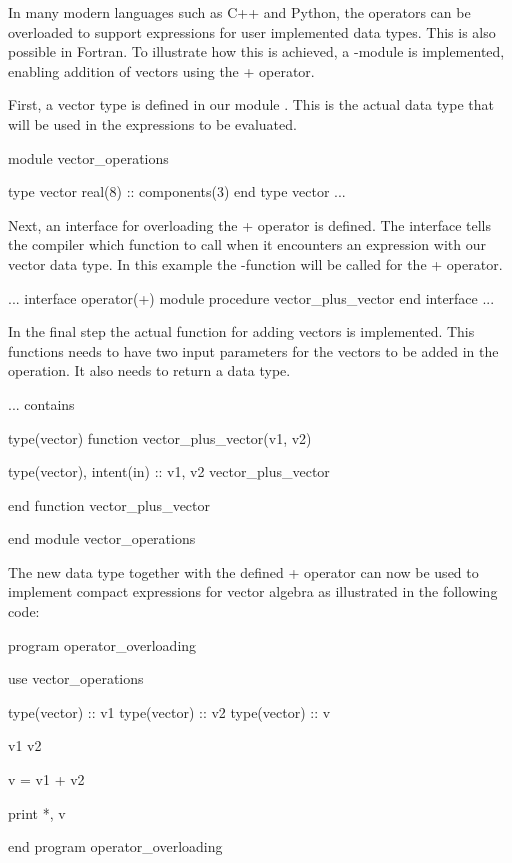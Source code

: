 In many modern languages such as C++ and Python, the operators can be overloaded to support expressions for user implemented data types. This is also possible in Fortran. To illustrate how this is achieved, a -module is implemented, enabling addition of vectors using the + operator.

First, a vector type is defined in our module . This is the actual data type that will be used in the expressions to be evaluated.

\begin{fortrancodeenv}
module vector_operations

	type vector
		real(8) :: components(3)
	end type vector
	...
\end{fortrancodeenv}

Next, an interface for overloading the + operator is defined. The interface tells the compiler which function to call when it encounters an expression with our vector data type. In this example the -function will be called for the + operator.

\begin{fortrancodeenv}
	...
	interface operator(+)
		module procedure vector_plus_vector
	end interface
	...
\end{fortrancodeenv}

In the final step the actual function for adding vectors is implemented. This functions needs to have two input parameters for the vectors to be added in the operation. It also needs to return a  data type.

\begin{fortrancodeenv}
...
contains

type(vector) function vector_plus_vector(v1, v2)

	type(vector), intent(in) :: v1, v2
	vector_plus_vector%
	
end function vector_plus_vector

end module vector_operations
\end{fortrancodeenv}

The new data type together with the defined + operator can now be used to implement compact expressions for vector algebra as illustrated in the following code:

\begin{fortrancodeenv}
program operator_overloading

	use vector_operations

	type(vector) :: v1
	type(vector) :: v2
	type(vector) :: v
	
	v1%
	v2%
	
	v = v1 + v2
	
	print *, v

end program operator_overloading
\end{fortrancodeenv}

